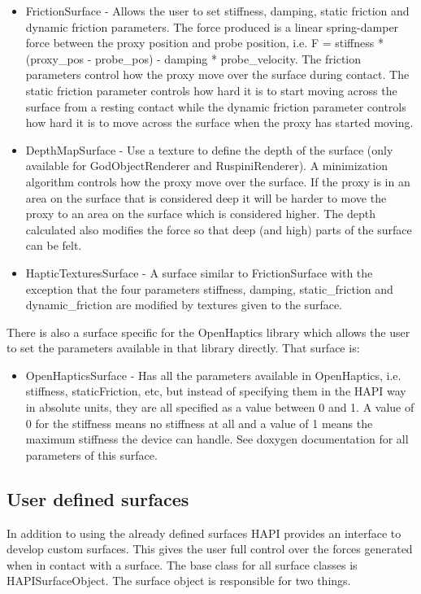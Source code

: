 \begin{itemize}
\item FrictionSurface - Allows the user to set stiffness, damping, static friction and dynamic friction parameters. The force produced is a linear spring-damper force between the proxy position and probe position, i.e. {\ttfamily F = stiffness * (proxy\_pos - probe\_pos) - damping * probe\_velocity}. The friction parameters control how the proxy move over the surface during contact. The static friction parameter controls how hard it is to start moving across the surface from a resting contact while the dynamic friction parameter controls how hard it is to move across the surface when the proxy has started moving.
\item DepthMapSurface - Use a texture to define the depth of the surface (only available for GodObjectRenderer and RuspiniRenderer). A minimization algorithm controls how the proxy move over the surface. If the proxy is in an area on the surface that is considered deep it will be harder to move the proxy to an area on the surface which is considered higher. The depth calculated also modifies the force so that deep (and high) parts of the surface can be felt.
\item HapticTexturesSurface - A surface similar to FrictionSurface with the exception that the four parameters stiffness, damping, static\_friction and dynamic\_friction are modified by textures given to the surface.
\end{itemize}

There is also a surface specific for the OpenHaptics
library which allows the user to set the parameters available in
that library directly. That surface is:
\begin{itemize}
\item OpenHapticsSurface - Has all the parameters available in
  OpenHaptics, i.e. stiffness, staticFriction, etc, but instead of
  specifying them in the HAPI way in absolute units, they are all
  specified as a value between 0 and 1. A value of 0 for the stiffness
  means no stiffness at all and a value of 1 means the maximum
  stiffness the device can handle. See doxygen documentation for all
  parameters of this surface.
\end{itemize}

\subsection{User defined surfaces}
In addition to using the already defined surfaces HAPI provides an interface to develop custom surfaces.
This gives the user full control over the forces generated when in contact with a surface.
The base class for all surface classes is HAPISurfaceObject. The surface object is responsible for two things. 


